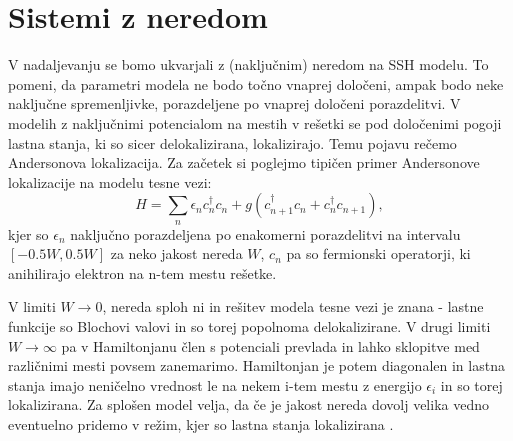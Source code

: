 \chapter{Sistemi z neredom}
V nadaljevanju se bomo ukvarjali z (naključnim) neredom na SSH modelu. To pomeni, da parametri modela ne bodo točno vnaprej določeni, ampak bodo neke naključne spremenljivke, porazdeljene po vnaprej določeni porazdelitvi.
V modelih z naključnimi potencialom na mestih v rešetki se pod določenimi pogoji lastna stanja, ki so sicer delokalizirana, lokalizirajo. Temu pojavu rečemo Andersonova lokalizacija.
Za začetek si poglejmo tipičen primer Andersonove lokalizacije na modelu tesne vezi:
\begin{equation}
H = \sum_n \epsilon_n c_n^\dagger c_n + g\left( c_{n+1}^\dagger c_n + c_n^\dagger c_{n+1} \right),
\end{equation}
kjer so $\epsilon_n$ naključno porazdeljena po enakomerni porazdelitvi na intervalu $[-0.5W,0.5W]$ za neko jakost nereda $W$, $c_n$ pa so fermionski operatorji, ki anihilirajo elektron na n-tem mestu rešetke.

V limiti $W \to 0$, nereda sploh ni in rešitev modela tesne vezi je znana - lastne funkcije so Blochovi valovi in so torej popolnoma delokalizirane.
V drugi limiti $W \to \infty$ pa v Hamiltonjanu člen s potenciali prevlada in lahko sklopitve med različnimi mesti povsem zanemarimo. Hamiltonjan je potem diagonalen in lastna stanja imajo neničelno vrednost le na nekem i-tem mestu z energijo $\epsilon_i$ in so torej lokalizirana. Za splošen model velja, da če je jakost nereda dovolj velika vedno eventuelno pridemo v režim, kjer so lastna stanja lokalizirana \cite{anderson}.

